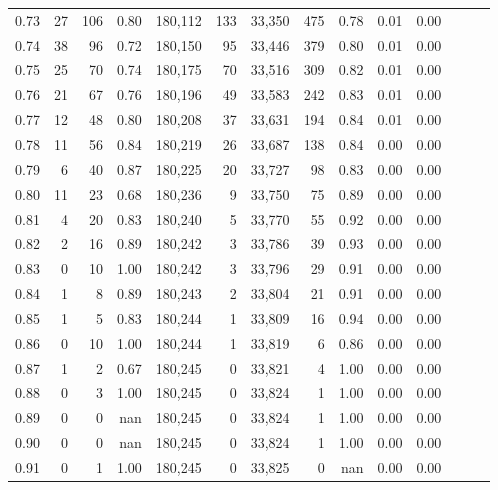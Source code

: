 \begin{tabular}{rrrrrrrrrrrrrr}
0.73 &     27 &  106 &  0.80 &  180,112 &      133 &  33,350 &     475 &  0.78 &  0.01 &      0.00 \\
0.74 &     38 &   96 &  0.72 &  180,150 &       95 &  33,446 &     379 &  0.80 &  0.01 &      0.00 \\
0.75 &     25 &   70 &  0.74 &  180,175 &       70 &  33,516 &     309 &  0.82 &  0.01 &      0.00 \\
0.76 &     21 &   67 &  0.76 &  180,196 &       49 &  33,583 &     242 &  0.83 &  0.01 &      0.00 \\
0.77 &     12 &   48 &  0.80 &  180,208 &       37 &  33,631 &     194 &  0.84 &  0.01 &      0.00 \\
0.78 &     11 &   56 &  0.84 &  180,219 &       26 &  33,687 &     138 &  0.84 &  0.00 &      0.00 \\
0.79 &      6 &   40 &  0.87 &  180,225 &       20 &  33,727 &      98 &  0.83 &  0.00 &      0.00 \\
0.80 &     11 &   23 &  0.68 &  180,236 &        9 &  33,750 &      75 &  0.89 &  0.00 &      0.00 \\
0.81 &      4 &   20 &  0.83 &  180,240 &        5 &  33,770 &      55 &  0.92 &  0.00 &      0.00 \\
0.82 &      2 &   16 &  0.89 &  180,242 &        3 &  33,786 &      39 &  0.93 &  0.00 &      0.00 \\
0.83 &      0 &   10 &  1.00 &  180,242 &        3 &  33,796 &      29 &  0.91 &  0.00 &      0.00 \\
0.84 &      1 &    8 &  0.89 &  180,243 &        2 &  33,804 &      21 &  0.91 &  0.00 &      0.00 \\
0.85 &      1 &    5 &  0.83 &  180,244 &        1 &  33,809 &      16 &  0.94 &  0.00 &      0.00 \\
0.86 &      0 &   10 &  1.00 &  180,244 &        1 &  33,819 &       6 &  0.86 &  0.00 &      0.00 \\
0.87 &      1 &    2 &  0.67 &  180,245 &        0 &  33,821 &       4 &  1.00 &  0.00 &      0.00 \\
0.88 &      0 &    3 &  1.00 &  180,245 &        0 &  33,824 &       1 &  1.00 &  0.00 &      0.00 \\
0.89 &      0 &    0 &   nan &  180,245 &        0 &  33,824 &       1 &  1.00 &  0.00 &      0.00 \\
0.90 &      0 &    0 &   nan &  180,245 &        0 &  33,824 &       1 &  1.00 &  0.00 &      0.00 \\
0.91 &      0 &    1 &  1.00 &  180,245 &        0 &  33,825 &       0 &   nan &  0.00 &      0.00 \\

\end{tabular}
